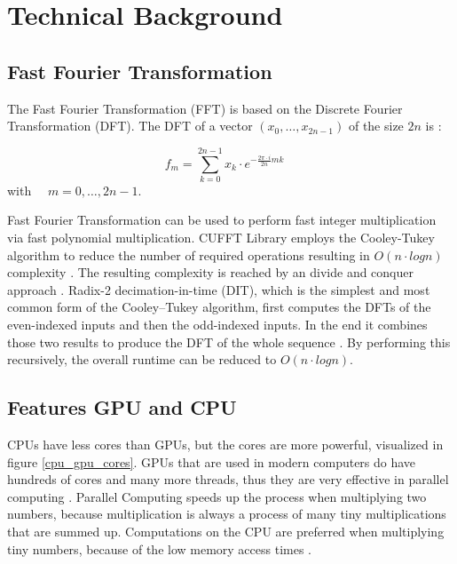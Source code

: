 \documentclass[12pt,a4paper]{article}
\begin{document}
\section{Technical Background}

\subsection{Fast Fourier Transformation}
The Fast Fourier Transformation (FFT) is based on the Discrete Fourier Transformation (DFT). The DFT of a vector $(x_{0},\dots ,x_{{2n-1}})$ of the size $2n$ is \cite{wiki:fft}:
\begin{center}
$$f_m = \sum_{k=0}^{2n-1}x_k \cdot e^{-\frac{2\pi \cdot i}{2n}mk} \quad$$ with $\quad m = 0,\dots,2n-1$.
\end{center}
Fast Fourier Transformation can be used to perform fast integer multiplication via fast polynomial multiplication. CUFFT Library employs the Cooley-Tukey algorithm to reduce the number of required operations resulting in $O(n \cdot logn)$ complexity \cite{nvidia2012cuda}. The resulting complexity is reached by an divide and conquer approach \cite{bekele2016cooley}.
Radix-2 decimation-in-time (DIT), which is the simplest and most common form of the Cooley–Tukey algorithm, first computes the DFTs of the even-indexed inputs and then the odd-indexed inputs. In the end it combines those two results to produce the DFT of the whole sequence \cite{wiki:xxx}. By performing this recursively, the overall runtime can be reduced to $O(n \cdot logn)$.

\subsection{Features GPU and CPU}
CPUs have less cores than GPUs, but the cores are more powerful, visualized in figure \ref{cpu_gpu_cores}. GPUs that are used in modern computers do have hundreds of cores and many more threads, thus they are very effective in parallel computing \cite{Palacios2011ACO}. Parallel Computing speeds up the process when multiplying two numbers, because multiplication is always a process of many tiny multiplications that are summed up. Computations on the CPU are preferred when multiplying tiny numbers, because of the low memory access times \cite{albers2009grafik}.
\end{document}
